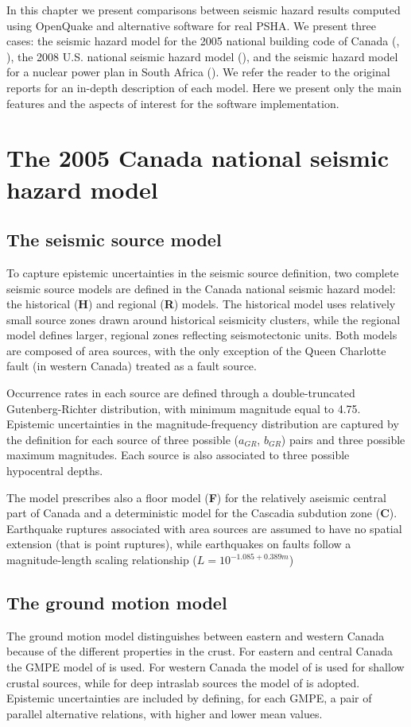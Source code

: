 In this chapter we present comparisons between seismic hazard results computed using OpenQuake and alternative software for real PSHA. We present three cases: the seismic hazard model for the 2005 national building code of Canada (\cite{adams2003}, \cite{halchuk2008}), the 2008 U.S. national seismic hazard model (\cite{petersen2008}), and the seismic hazard model for a nuclear power plan in South Africa (\cite{bommer2013}). We refer the reader to the original reports for an in-depth description of each model. Here we present only the main features and the aspects of interest for the software implementation.


\section{The 2005 Canada national seismic hazard model}

\subsection{The seismic source model}
To capture epistemic uncertainties in the seismic source definition, two complete seismic source models are defined in the Canada national seismic hazard model: the historical (\textbf{H}) and regional (\textbf{R}) models. The historical model uses relatively small source zones drawn around historical seismicity clusters, while the regional model defines larger, regional zones reflecting seismotectonic units. Both models are composed of area sources, with the only exception of the Queen Charlotte fault (in western Canada) treated as a fault source. 

Occurrence rates in each source are defined through a double-truncated Gutenberg-Richter distribution, with minimum magnitude equal to 4.75. Epistemic uncertainties in the magnitude-frequency distribution are captured by the definition for each source of three possible ($a_{GR}$, $b_{GR}$) pairs and three possible maximum magnitudes. Each source is also associated to three possible hypocentral depths.

The model prescribes also a floor model (\textbf{F}) for the relatively aseismic central part of Canada and a deterministic model for the Cascadia subdution zone (\textbf{C}). Earthquake ruptures associated with area sources are assumed to have no spatial extension (that is point ruptures), while earthquakes on faults follow a magnitude-length scaling relationship ($L=10^{-1.085 + 0.389 m}$)

\subsection{The ground motion model}
The ground motion model distinguishes between eastern and western Canada because of the different properties in the crust. For eastern and central Canada the GMPE model of \citet{ab1995} is used. For western Canada the model of \citet{bjf1993} is used for shallow crustal sources, while for deep intraslab sources the model of \citet{y1997} is adopted. Epistemic uncertainties are included by defining, for each GMPE, a pair of parallel alternative relations, with higher and lower mean values.

